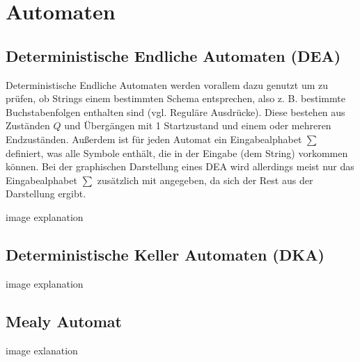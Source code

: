 \section{Automaten}

\subsection{Deterministische Endliche Automaten (DEA)}

Deterministische Endliche Automaten werden vorallem dazu genutzt um zu prüfen,
ob Strings einem bestimmten Schema entsprechen, also z. B. bestimmte Buchstabenfolgen
enthalten sind (vgl. Reguläre Ausdrücke).
Diese bestehen aus Zuständen $Q$ und Übergängen mit 1 Startzustand und einem oder
mehreren Endzuständen. Außerdem ist für jeden Automat ein Eingabealphabet $\sum$
definiert, was alle Symbole enthält, die in der Eingabe (dem String) vorkommen können.
Bei der graphischen Darstellung eines DEA wird allerdings meist nur das Eingabealphabet
$\sum$ zusätzlich mit angegeben, da sich der Rest aus der Darstellung ergibt.




image
explanation

\subsection{Deterministische Keller Automaten (DKA)}

image
explanation

\subsection{Mealy Automat}

image
exlanation
